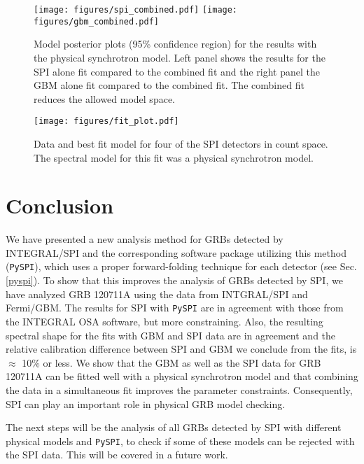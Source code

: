 \documentclass[twocolumn,traditabstract]{aa}
\begin{document}
\begin{figure*}
  \begin{centering}
    \texttt{[image: figures/spi\_combined.pdf]}
    \texttt{[image: figures/gbm\_combined.pdf]}
    \caption{Model posterior plots (95\% confidence region) for the results with the physical synchrotron model. Left panel shows the results for the SPI alone fit compared to the combined fit and the right panel the GBM alone fit compared to the combined fit. The combined fit reduces the allowed model space.}
    \label{fig:model_plot_syn}
  \end{centering}
\end{figure*}
\begin{figure*}
  \begin{centering}
    \texttt{[image: figures/fit\_plot.pdf]}
    \caption{Data and best fit model for four of the SPI detectors in count space. The spectral model for this fit was a physical synchrotron model.}
    \label{fig:dataplot}
  \end{centering}
\end{figure*}
\clearpage
\section{Conclusion}
\label{conclusion}
We have presented a new analysis method for GRBs detected by INTEGRAL/SPI and the corresponding software package utilizing this method ({\tt PySPI}), which uses a proper forward-folding technique for each detector (see Sec. \ref{pyspi}). To show that this improves the analysis of GRBs detected by SPI, we have analyzed GRB 120711A using the data from INTGRAL/SPI and Fermi/GBM. The results for SPI with {\tt PySPI} are in agreement with those from the INTEGRAL OSA software, but more constraining. Also, the resulting spectral shape for the fits with GBM and SPI data are in agreement and the relative calibration difference between SPI and GBM we conclude from the fits, is $\approx$ 10\% or less. We show that the GBM as well as the SPI data for GRB 120711A can be fitted well with a physical synchrotron model and that combining the data in a simultaneous fit improves the parameter constraints. Consequently, SPI can play an important role in physical GRB model checking.

The next steps will be the analysis of all GRBs detected by SPI with different physical models and {\tt PySPI}, to check if some of these models can be rejected with the SPI data. This will be covered in a future work.
\end{document}
